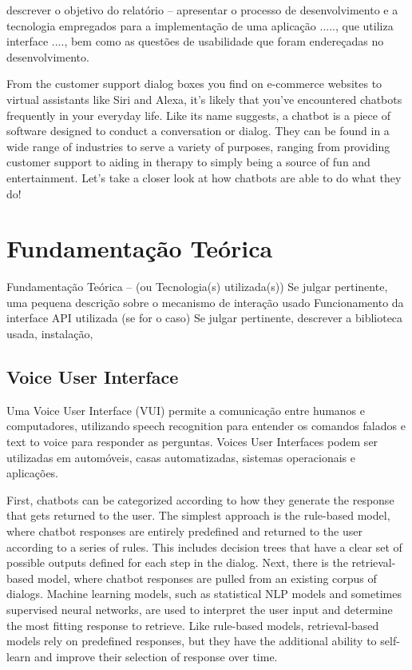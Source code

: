 \documentclass[
	12pt,				%
	oneside,   	        %
	a4paper,			%
	english,			%
	french,				%
	spanish,			%
	brazil,				%
	]{pacotes/abntex2}
\begin{document}
descrever o objetivo do relatório – apresentar o processo de desenvolvimento e
a tecnologia empregados para a implementação de uma aplicação ....., que utiliza interface ....,
bem como as questões de usabilidade que foram endereçadas no desenvolvimento.

From the customer support dialog boxes you find on e-commerce websites to virtual assistants like Siri and Alexa, it’s likely that you’ve encountered chatbots frequently in your everyday life. Like its name suggests, a chatbot is a piece of software designed to conduct a conversation or dialog. They can be found in a wide range of industries to serve a variety of purposes, ranging from providing customer support to aiding in therapy to simply being a source of fun and entertainment. Let’s take a closer look at how chatbots are able to do what they do!

\section{Fundamentação Teórica}
Fundamentação Teórica – (ou Tecnologia(s) utilizada(s))
Se julgar pertinente, uma pequena descrição sobre o mecanismo de interação usado
Funcionamento da interface
API utilizada (se for o caso)
Se julgar pertinente, descrever a biblioteca usada, instalação,


\subsection{Voice User Interface}
Uma Voice User Interface (VUI) permite a comunicação entre humanos e computadores, utilizando speech recognition para entender os comandos falados e text to voice para responder as perguntas.
Voices User Interfaces podem ser utilizadas em automóveis, casas automatizadas, sistemas operacionais e aplicações.


First, chatbots can be categorized according to how they generate the response that gets returned to the user. The simplest approach is the rule-based model, where chatbot responses are entirely predefined and returned to the user according to a series of rules. This includes decision trees that have a clear set of possible outputs defined for each step in the dialog. 
Next, there is the retrieval-based model, where chatbot responses are pulled from an existing corpus of dialogs. Machine learning models, such as statistical NLP models and sometimes supervised neural networks, are used to interpret the user input and determine the most fitting response to retrieve. Like rule-based models, retrieval-based models rely on predefined responses, but they have the additional ability to self-learn and improve their selection of response over time.
\end{document}
